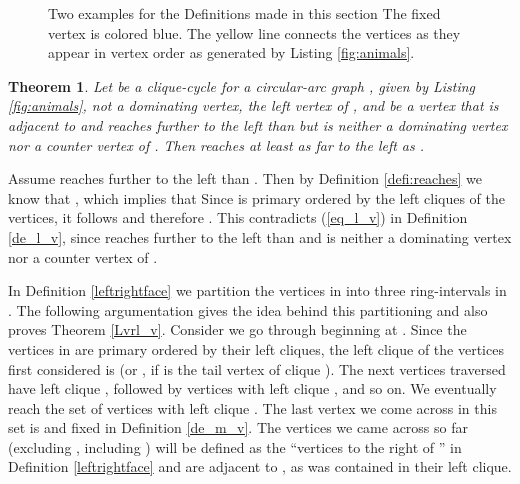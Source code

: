 \documentclass[10pt]{article}
\newtheorem{theorem}{Theorem}[section]
\newenvironment{proof}{\noindent{\bf Proof~}}{\null\hfill \par\medskip}
\newcommand{\q}[1]{``#1''}\newcommand{\fu}[1]{\mathcal{#1}}\newcommand{\mc}[1]{\mathsf{#1}}\newcommand{\ri}[1]{\mathscr{#1}}\newcommand{\co}[1]{\fu{C}({#1})}\newcommand{\lc}[1]{\alpha(#1)}\newcommand{\rc}[1]{\beta(#1)}\newcommand{\ema}[1]{\mathcal{#1}}\newcommand{\fe}[2]{\fu{F}(#1,#2)}\newcommand{\lv}[1]{l_{#1}}\newcommand{\rv}[1]{r_{#1}}\newcommand{\mv}[1]{m_{#1}}\newcommand{\lvv}{\lv{v}}
\begin{document}
\begin{figure}
\centering
{}\quad
\vspace{-5pt}\caption[An example for the vertex partition defined in Section \ref{furtherDefs}]{Two examples for the Definitions made in this section
The fixed vertex  is colored blue. 
The yellow line connects the vertices as they appear in vertex order  as generated by Listing \ref{fig:animals}.
}
\label{fig:anotherExamplefurtherDefs}
\end{figure}




\begin{theorem}\label{no_vertex_further_than_lv}
Let  be a clique-cycle for a circular-arc graph ,  
given by Listing \ref{fig:animals},  not a dominating vertex,  the left 
vertex of , and  be a vertex that is adjacent to  and reaches further to the left than  but is neither 
a dominating vertex nor a counter vertex of . 
Then  reaches at least as far to the left as .
\end{theorem}



\begin{proof}
Assume  reaches further to the left than .
Then by Definition \ref{defi:reaches} we know that 
, which implies 
that 
Since  is primary ordered by the left cliques of the vertices, it follows 
 and therefore 
.
This contradicts (\ref{eq_l_v}) in Definition \ref{de_l_v}, since  reaches 
further to the left than  and is neither a 
dominating vertex nor a counter vertex of .
\end{proof}

In Definition \ref{leftrightface} we partition the vertices in  into three 
ring-intervals in .
The following argumentation gives the idea behind this partitioning and also proves 
Theorem \ref{Lvrl_v}. Consider we go through  beginning at .
Since the vertices in  are primary ordered by their left cliques, the left 
clique of the vertices first considered is  (or , if  is the 
tail vertex of clique ).
The next vertices traversed have left clique , followed by vertices with 
left clique , and so on.
We eventually reach the set of vertices with left clique .
The last vertex we come across in this set is  and fixed in Definition \ref{de_m_v}.
The vertices we came across so far (excluding , including ) will be 
defined as the \q{vertices to the right of } in Definition \ref{leftrightface} and are 
adjacent to , as  was contained in their left clique.
\end{document}
